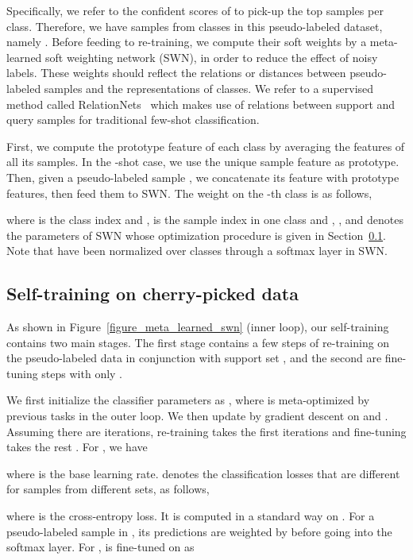 \documentclass{article}
\begin{document}
Specifically, we refer to the confident scores of  to pick-up the top  samples per class. 
Therefore, we have  samples from  classes in this pseudo-labeled dataset, namely .
Before feeding  to re-training, we compute their soft weights by a meta-learned soft weighting network (SWN), in order to reduce the effect of noisy labels.
These weights should reflect the relations or distances between pseudo-labeled samples and the representations of  classes. 
We refer to a supervised method called RelationNets~\cite{SungCVPR2018} which makes use of relations between support and query samples for traditional few-shot classification.


First, we compute the prototype feature of each class by averaging the features of all its samples.
In the -shot case, we use the unique sample feature as prototype.
Then, given a pseudo-labeled sample , we concatenate its feature with  prototype features, then feed them to SWN. The weight on the -th class is as follows,

where  is the class index and ,  is the sample index in one class and , , and  denotes the parameters of SWN whose optimization procedure is given in Section~\ref{sec_retraining}.
Note that  have been normalized over  classes through a softmax layer in SWN.




\subsection{Self-training on cherry-picked data}
\label{sec_retraining}

As shown in Figure~\ref{figure_meta_learned_swn} (inner loop), our self-training contains two main stages. 
The first stage contains a few steps of re-training on the pseudo-labeled data  in conjunction with support set ,
and the second are fine-tuning steps with only .

We first initialize the
classifier parameters as , where  is meta-optimized by previous tasks in the outer loop.
We then update  by gradient descent on  and .
Assuming there are  iterations, re-training takes the first  iterations and fine-tuning takes the rest . 
For , we have

where  is the base learning rate.  denotes the classification losses that are different for samples from different sets, as follows,

where  is the cross-entropy loss.
It is computed in a standard way on . For a pseudo-labeled sample in , its predictions are weighted by  before going into the softmax layer.
For ,  is fine-tuned on  as
\end{document}
